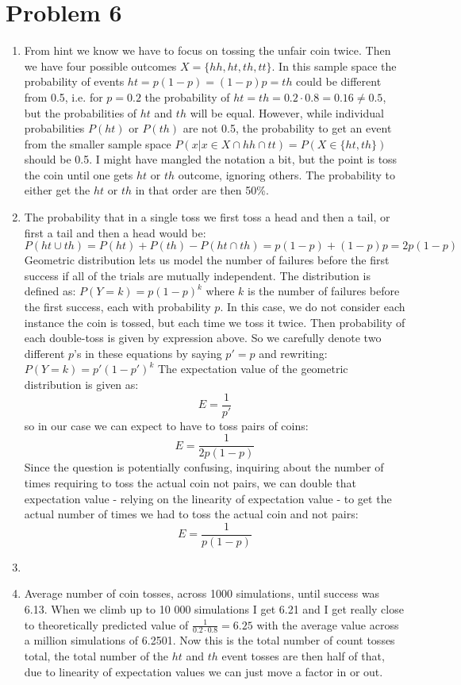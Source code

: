 \documentclass{article}
\newcommand{\1}{\mathbf{1}}
\begin{document}
\newpage
\section*{Problem 6}
\begin{enumerate}
    \item From hint we know we have to focus on tossing the unfair coin twice. Then we have four possible outcomes $X=\{hh, ht, th, tt\}$. In this sample space the probability of events $ht = p(1-p) = (1-p)p = th$ could be different from 0.5, i.e. for $p=0.2$ the probability of $ht=th=0.2\cdot 0.8=0.16 \neq 0.5$, but the probabilities of $ht$ and $th$ will be equal. However, while individual probabilities $P(ht)$ or $P(th)$ are not 0.5, the probability to get an event from the smaller sample space $P(x|x \in X \cap hh \cap tt) = P(X\in\{ht, th\})$ should be 0.5. I might have mangled the notation a bit, but the point is toss the coin until one gets $ht$ or $th$ outcome, ignoring others. The probability to either get the $ht$ or $th$ in that order are then 50\%. 
    
    \item The probability that in a single toss we first toss a head and then a tail, or first a tail and then a head would be:
    $$P(ht \cup th) = P(ht) + P(th) - P(ht \cap th) = p(1-p) + (1-p)p = 2p(1-p)$$
    Geometric distribution lets us model the number of failures before the first success if all of the trials are mutually independent. The distribution is defined as:
    $P(Y=k) = p(1-p)^k$
    where $k$ is the number of failures before the first success, each with probability $p$. In this case, we do not consider each instance the coin is tossed, but each time we toss it twice. Then probability of each double-toss is given by expression above. So we carefully denote two different $p$'s in these equations by saying $p' = p$ and rewriting:
    $P(Y=k) = p'(1-p')^k$
    The expectation value of the geometric distribution is given as:
    $$E=\frac{1}{p'}$$
    so in our case we can expect to have to toss pairs of coins:
    $$E = \frac{1}{2p(1-p)}$$
    Since the question is potentially confusing, inquiring about the number of times requiring to toss the actual coin not pairs, we can double that expectation value - relying on the linearity of expectation value - to get the actual number of times we had to toss the actual coin and not pairs:
    $$E = \frac{1}{p(1-p)}$$
    
    \item 
    
    \item Average number of coin tosses, across 1000 simulations, until success was 6.13. When we climb up to 10 000 simulations I get 6.21 and I get really close to theoretically predicted value of $\frac{1}{0.2\cdot 0.8}=6.25$ with the average value across a million simulations of 6.2501. Now this is the total number of count tosses total, the total number of the $ht$ and $th$ event tosses are then half of that, due to linearity of expectation values we can just move a factor in or out. 
\end{enumerate}
\end{document}
